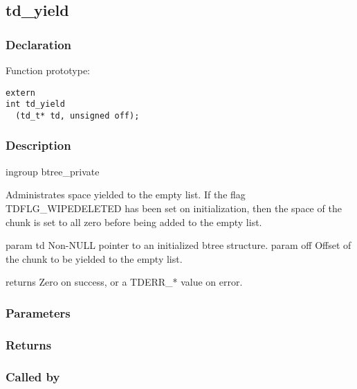 
\newpage
\subsection{td\_yield}
\subsubsection{Declaration} Function prototype:

\begin{verbatim}
extern
int td_yield
  (td_t* td, unsigned off);
\end{verbatim}

\subsubsection{Description}


 ingroup btree\_private

 Administrates space yielded to the empty list.
 If the flag TDFLG\_WIPEDELETED has been set on initialization,
 then the space of the chunk is set to all zero before being
 added to the empty list.

 param td Non-NULL pointer to an initialized btree structure.
 param off Offset of the chunk to be yielded to the empty list.

 returns Zero on success, or a TDERR\_* value on error.
 

\subsubsection{Parameters}
\subsubsection{Returns}
\subsubsection{Called by}
